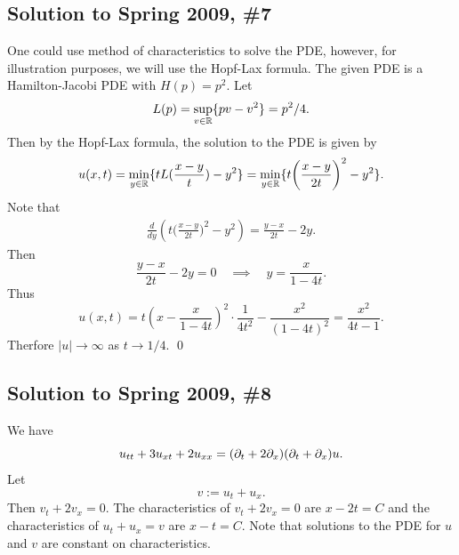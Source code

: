 \subsection*{Solution to Spring 2009, \#7}\label{s097}
One could use method of characteristics to solve the PDE, however, for illustration purposes, we will use the Hopf-Lax formula. The given PDE is a Hamilton-Jacobi
PDE with $H(p) = p^{2}$. Let
$$L(p) = \sup_{v \in \mathbb{R}}\{pv - v^{2}\} = p^{2}/4.$$
Then by the Hopf-Lax formula, the solution to the PDE is given by
$$u(x, t) = \min_{y \in \mathbb{R}}\{t L(\frac{x - y}{t}) - y^{2}\} = \min_{y \in \mathbb{R}}\{t\bigg(\frac{x - y}{2t}\bigg)^{2} - y^{2}\}.$$
Note that
\begin{align*}
\frac{d}{dy}(t\bigg(\frac{x - y}{2t}\bigg)^{2} - y^{2}) = \frac{y - x}{2t} - 2y.
\end{align*}
Then
$$\frac{y - x}{2t} - 2y = 0 \quad\implies\quad y = \frac{x}{1 - 4t}.$$
Thus
$$u(x, t) = t(x - \frac{x}{1 - 4t})^{2}\cdot \frac{1}{4t^{2}} - \frac{x^{2}}{(1 - 4t)^{2}} = \frac{x^{2}}{4t - 1}.$$
Therfore $|u| \rightarrow \infty$ as $t \rightarrow 1/4$.
\hfill\qed

\subsection*{Solution to Spring 2009, \#8}\label{s098}
We have $$u_{tt} + 3u_{xt} + 2u_{xx} = (\partial_{t} + 2\partial_{x})(\partial_{t} + \partial_{x})u.$$
Let $$v := u_{t} + u_{x}.$$ Then $v_{t} + 2v_{x} = 0$.
The characteristics of $v_{t} + 2v_{x} = 0$ are $x - 2t = C$ and the characteristics of $u_{t} + u_{x} = v$ are $x - t = C$.
Note that solutions to the PDE for $u$ and $v$ are constant on characteristics.

